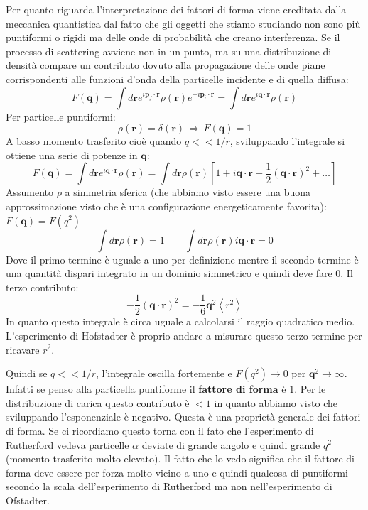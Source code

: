 Per quanto riguarda l'interpretazione dei fattori di forma viene ereditata dalla meccanica quantistica dal fatto che gli oggetti che stiamo studiando non sono più puntiformi o rigidi ma delle onde di probabilità che creano interferenza. Se il processo di scattering avviene non in un punto, ma su una distribuzione di densità compare un contributo dovuto alla propagazione delle onde piane corrispondenti alle funzioni d’onda della particelle incidente e di quella
diffusa:
\begin{equation*}
    F(\mathbf{q})=\int d\mathbf{r}e^{i\mathbf{p}_f\cdot\mathbf{r}}\rho(\mathbf{r})e^{-i\mathbf{p}_i\cdot\mathbf{r}}=\int d\mathbf{r}e^{i\mathbf{q}\cdot\mathbf{r}}\rho(\mathbf{r})
\end{equation*}
Per particelle puntiformi:
\begin{equation*}
    \rho(\mathbf{r})=\delta(\mathbf{r})\,\Rightarrow\,F(\mathbf{q})=1
\end{equation*}
A basso momento trasferito cioè quando $q<<1/r$, sviluppando l'integrale si ottiene una serie di potenze in $\mathbf{q}$:
\begin{equation*}
    F(\mathbf{q})=\int d\mathbf{r}e^{i\mathbf{q}\cdot\mathbf{r}}\rho(\mathbf{r})=\int d\mathbf{r}\rho(\mathbf{r})\left[1+i\mathbf{q}\cdot\mathbf{r}-\frac{1}{2}\left(\mathbf{q}\cdot\mathbf{r}\right)^2+\ldots\right]
\end{equation*}
Assumento $\rho$ a simmetria sferica (che abbiamo visto essere una buona approssimazione visto che è una configurazione energeticamente favorita): $F(\mathbf{q})=F(q^2)$
\begin{equation*}
    \int d\mathbf{r}\rho(\mathbf{r})=1 \qquad \int d\mathbf{r}\rho(\mathbf{r})i\mathbf{q}\cdot\mathbf{r}=0
\end{equation*}
Dove il primo termine è uguale a uno per definizione mentre il secondo termine è una quantità dispari integrato in un dominio simmetrico e quindi deve fare $0$. Il terzo contributo:
\begin{equation*}
    -\frac{1}{2}\left(\mathbf{q}\cdot\mathbf{r}\right)^2=-\frac{1}{6}\mathbf{q}^2\left\langle r^2\right\rangle
\end{equation*}
In quanto questo integrale è circa uguale a calcolarsi il raggio quadratico medio. L'esperimento di Hofstadter è proprio andare a misurare questo terzo termine per ricavare $r^2$. 

Quindi se $q<<1/r$, l'integrale oscilla fortemente e $F(q^2)\to0$ per $\mathbf{q}^2\to\infty$. Infatti se penso alla particella puntiforme il \textbf{fattore di forma} è $1$. Per le distribuzione di carica questo contributo è $<1$ in quanto abbiamo visto che sviluppando l'esponenziale è negativo. Questa è una proprietà generale dei fattori di forma. Se ci ricordiamo questo torna con il fato che l'esperimento di Rutherford vedeva particelle $\alpha$ deviate di grande angolo e quindi grande $q^2$ (momento trasferito molto elevato). Il fatto che lo vedo significa che il fattore di forma deve essere per forza molto vicino a uno e quindi qualcosa di puntiformi secondo la scala dell'esperimento di Rutherford ma non nell'esperimento di Ofstadter.

